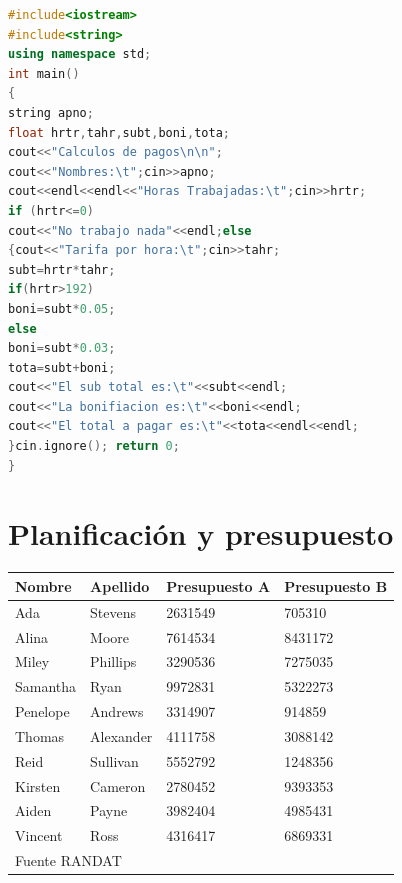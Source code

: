 \documentclass[12pt]{report} %
\begin{document}
\lipsum[50-51]

\begin{lstlisting}[language=C++]
#include<iostream>
#include<string>
using namespace std;
int main()
{
string apno;
float hrtr,tahr,subt,boni,tota;
cout<<"Calculos de pagos\n\n";
cout<<"Nombres:\t";cin>>apno;
cout<<endl<<endl<<"Horas Trabajadas:\t";cin>>hrtr;
if (hrtr<=0)
cout<<"No trabajo nada"<<endl;else
{cout<<"Tarifa por hora:\t";cin>>tahr;
subt=hrtr*tahr;
if(hrtr>192)
boni=subt*0.05;
else
boni=subt*0.03;
tota=subt+boni;
cout<<"El sub total es:\t"<<subt<<endl;
cout<<"La bonifiacion es:\t"<<boni<<endl;
cout<<"El total a pagar es:\t"<<tota<<endl<<endl;
}cin.ignore(); return 0;
}
\end{lstlisting}

\lipsum[51]

\chapter{Planificación y presupuesto}

\lipsum[103]

\begin{table} [h]
	{\begin{tabular}{|p{3cm}|p{3cm}|p{3cm}|p{3cm}|}
		\hline
		\rowcolor{gray75}	
		Nombre & Apellido & Presupuesto A & Presupuesto B \\
		\hline
		Ada & Stevens & 2631549 & 705310 \\
		\hline
		Alina & Moore & 7614534 & 8431172 \\
		\hline
		Miley & Phillips & 3290536 & 7275035\\
		\hline
		Samantha & Ryan & 9972831 & 5322273 \\
		\hline
		Penelope & Andrews & 3314907 & 914859\\
		\hline
		Thomas & Alexander & 4111758 & 3088142 \\
		\hline
		Reid & Sullivan & 5552792 & 1248356 \\
		\hline
		Kirsten & Cameron & 2780452 & 9393353 \\
		\hline
		Aiden & Payne & 3982404 & 4985431 \\
		\hline
		Vincent & Ross & 4316417 & 6869331\\
		\hline
		\multicolumn{4}{|l|}{Fuente RANDAT} \\
		\hline
	\end{tabular}}
\end{table}

\lipsum[5-7]	
\end{document}
